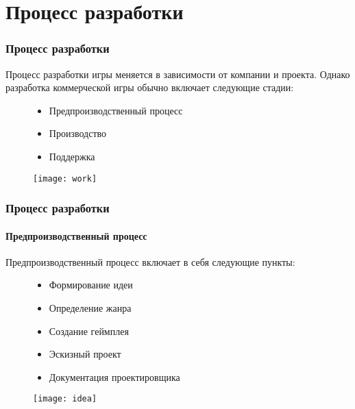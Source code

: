 \section{Процесс разработки}
\begin{frame}
    \frametitle{Процесс разработки}
    Процесс разработки игры меняется в зависимости от компании и проекта. Однако разработка 
    коммерческой игры обычно включает следующие стадии:
    \begin{figure}
        \begin{minipage}{0.47\textwidth}
            \begin{itemize}
                \item Предпроизводственный процесс
                \item Производство
                \item Поддержка
            \end{itemize}
        \end{minipage}
        \begin{minipage}{0.5\textwidth}
            \texttt{[image: work]}
        \end{minipage}
    \end{figure}
\end{frame}

\begin{frame}
    \frametitle{Процесс разработки}
    \framesubtitle{Предпроизводственный процесс}
    Предпроизводственный процесс включает в себя следующие пункты:
    \begin{figure}
        \begin{minipage}{0.47\textwidth}
            \begin{itemize}
                \item Формирование идеи
                \item Определение жанра
                \item Создание геймплея
                \item Эскизный проект
                \item Документация проектировщика
            \end{itemize}
        \end{minipage}
        \begin{minipage}{0.5\textwidth}
            \texttt{[image: idea]}
        \end{minipage}
    \end{figure}
\end{frame}

